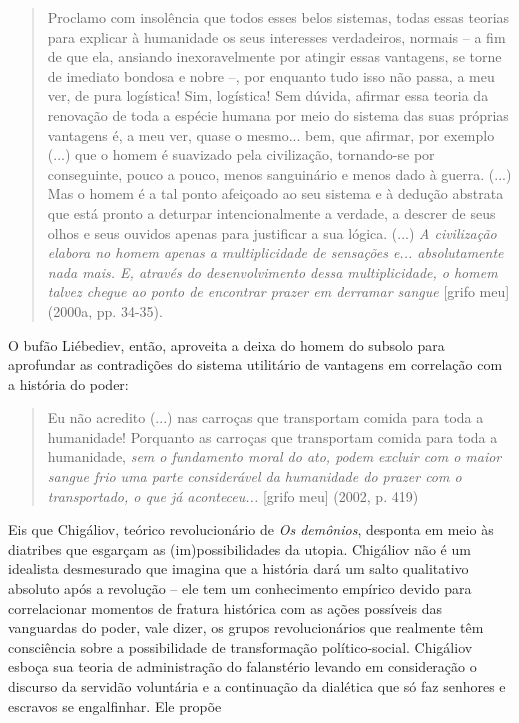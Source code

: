 \begin{quote}
Proclamo com insolência que todos esses belos sistemas, todas essas
teorias para explicar à humanidade os seus interesses verdadeiros,
normais -- a fim de que ela, ansiando inexoravelmente por atingir essas
vantagens, se torne de imediato bondosa e nobre --, por enquanto tudo
isso não passa, a meu ver, de pura logística! Sim, logística! Sem
dúvida, afirmar essa teoria da renovação de toda a espécie humana por
meio do sistema das suas próprias vantagens é, a meu ver, quase o
mesmo... bem, que afirmar, por exemplo (...) que o homem é suavizado
pela civilização, tornando-se por conseguinte, pouco a pouco, menos
sanguinário e menos dado à guerra. (...) Mas o homem é a tal ponto
afeiçoado ao seu sistema e à dedução abstrata que está pronto a deturpar
intencionalmente a verdade, a descrer de seus olhos e seus ouvidos
apenas para justificar a sua lógica. (...) \emph{A civilização elabora
no homem apenas a multiplicidade de sensações e... absolutamente nada
mais. E, através do desenvolvimento dessa multiplicidade, o homem talvez
chegue ao ponto de encontrar prazer em derramar sangue} {[}grifo meu{]}
(2000a, pp. 34-35).
\end{quote}

O bufão Liébediev, então, aproveita a deixa do homem do subsolo para
aprofundar as contradições do sistema utilitário de vantagens em
correlação com a história do poder:

\begin{quote}
Eu não acredito (...) nas carroças que transportam comida para toda a
humanidade! Porquanto as carroças que transportam comida para toda a
humanidade, \emph{sem o fundamento moral do ato, podem excluir com o
maior sangue frio uma parte considerável da humanidade do prazer com o
transportado, o que já aconteceu...} {[}grifo meu{]} (2002, p. 419)
\end{quote}

Eis que Chigáliov, teórico revolucionário de \emph{Os demônios},
desponta em meio às diatribes que esgarçam as (im)possibilidades da
utopia. Chigáliov não é um idealista desmesurado que imagina que a
história dará um salto qualitativo absoluto após a revolução -- ele tem
um conhecimento empírico devido para correlacionar momentos de fratura
histórica com as ações possíveis das vanguardas do poder, vale dizer, os
grupos revolucionários que realmente têm consciência sobre a
possibilidade de transformação político-social. Chigáliov esboça sua
teoria de administração do falanstério levando em consideração o
discurso da servidão voluntária e a continuação da dialética que só faz
senhores e escravos se engalfinhar. Ele propõe

